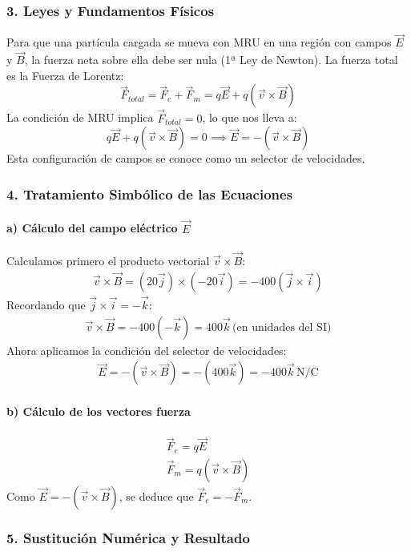 \subsubsection*{3. Leyes y Fundamentos Físicos}
Para que una partícula cargada se mueva con MRU en una región con campos $\vec{E}$ y $\vec{B}$, la fuerza neta sobre ella debe ser nula (1ª Ley de Newton). La fuerza total es la Fuerza de Lorentz:
$$ \vec{F}_{total} = \vec{F}_e + \vec{F}_m = q\vec{E} + q(\vec{v} \times \vec{B}) $$
La condición de MRU implica $\vec{F}_{total} = 0$, lo que nos lleva a:
$$ q\vec{E} + q(\vec{v} \times \vec{B}) = 0 \implies \vec{E} = -(\vec{v} \times \vec{B}) $$
Esta configuración de campos se conoce como un selector de velocidades.

\subsubsection*{4. Tratamiento Simbólico de las Ecuaciones}
\paragraph*{a) Cálculo del campo eléctrico $\vec{E}$}
Calculamos primero el producto vectorial $\vec{v} \times \vec{B}$:
\begin{gather}
    \vec{v} \times \vec{B} = (20\vec{j}) \times (-20\vec{i}) = -400 (\vec{j} \times \vec{i})
\end{gather}
Recordando que $\vec{j} \times \vec{i} = -\vec{k}$:
\begin{gather}
    \vec{v} \times \vec{B} = -400(-\vec{k}) = 400\vec{k} \, \text{(en unidades del SI)}
\end{gather}
Ahora aplicamos la condición del selector de velocidades:
\begin{gather}
    \vec{E} = -(\vec{v} \times \vec{B}) = -(400\vec{k}) = -400\vec{k} \, \text{N/C}
\end{gather}
\paragraph*{b) Cálculo de los vectores fuerza}
\begin{gather}
    \vec{F}_e = q\vec{E} \\
    \vec{F}_m = q(\vec{v} \times \vec{B})
\end{gather}
Como $\vec{E} = -(\vec{v} \times \vec{B})$, se deduce que $\vec{F}_e = - \vec{F}_m$.

\subsubsection*{5. Sustitución Numérica y Resultado}
